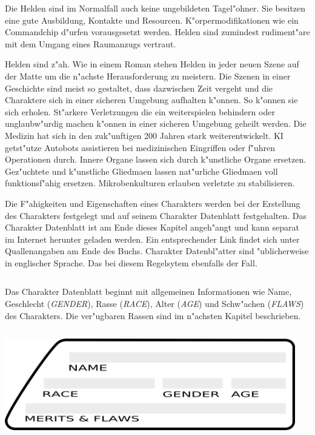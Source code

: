 Die Helden sind im Normalfall auch keine ungebildeten Tagel"ohner. Sie besitzen eine gute Ausbildung, Kontakte und Resourcen. K"orpermodifikationen wie ein Commandchip d"urfen vorausgesetzt werden. Helden sind zumindest rudiment"are mit dem Umgang eines Raumanzugs vertraut.

Helden sind z"ah. Wie in einem Roman stehen Helden in jeder neuen Szene auf der Matte um die n"achste Herausforderung zu meistern. Die Szenen in einer Geschichte sind meist so gestaltet, dass dazwischen Zeit vergeht und die Charaktere sich in einer sicheren Umgebung aufhalten k"onnen. So k"onnen sie sich erholen. St"arkere Verletzungen die ein weiterspielen behindern oder unglaubw"urdig machen k"onnen in einer sicheren Umgebung geheilt werden. Die Medizin hat sich in den zuk"unftigen 200 Jahren stark weiterentwickelt. KI getst"utze Autobots assistieren bei medizinischen Eingriffen oder f"uhren Operationen durch. Innere Organe lassen sich durch k"unstliche Organe ersetzen. Gez"uchtete und k"unstliche Gliedma\3en lassen nat"urliche Gliedma\3en voll funktionsf"ahig ersetzen. Mikrobenkulturen erlauben verletzte zu stabilisieren.


Die F"ahigkeiten und Eigenschaften eines Charakters werden bei der Erstellung des Charakters festgelegt und auf seinem Charakter Datenblatt festgehalten. Das Charakter Datenblatt ist am Ende dieses Kapitel angeh"angt und kann separat im Internet herunter geladen werden. Ein entsprechender Link findet sich unter Quallenangaben am Ende des Buchs. Charakter Datenbl"atter sind "ublicherweise in englischer Sprache. Das bei diesem Regelsytem ebenfalls der Fall.

\begin{column}[l]{0.52}
    Das Charakter Datenblatt beginnt mit allgemeinen Informationen wie Name, Geschlecht (\emph{GENDER}), Rasse (\emph{RACE}), Alter (\emph{AGE}) und Schw"achen (\emph{FLAWS}) des Charakters. Die ver"ugbaren Rassen sind im n"achsten Kapitel beschrieben.
\end{column}
\begin{column}[r]{0.48}
    \centering
    \includegraphics[width=0.95\textwidth]{images/character_base_stats}
    \medskip   
\end{column}

